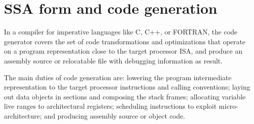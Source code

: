 \chapter{SSA form and code generation }
\label{chapter:ssa-codegen}

In a compiler for imperative languages like C, C++, or FORTRAN, the code
generator covers the set of code transformations and optimizations that operate
on a program representation close to the target processor ISA, and produce an
assembly source or relocatable file with debugging information as result.

The main duties of code generation are: lowering the program intermediate
representation to the target processor instructions and calling conventions;
laying out data objects in sections and composing the stack frames; allocating
variable live ranges to architectural registers; scheduling instructions to
exploit micro-architecture; and producing assembly source or object code.

